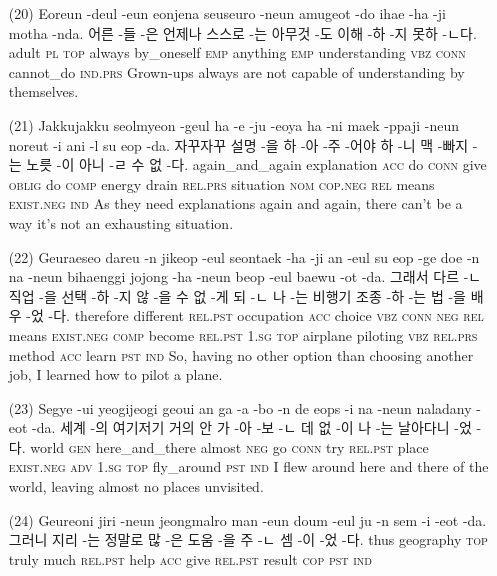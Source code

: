 \begin{itemize}
\item [(20)]
\tgl
		{Eoreun -deul -eun eonjena seuseuro -neun amugeot -do ihae -ha -ji motha -nda.}
		{어른 -들 -은 언제나 스스로 -는 아무것 -도 이해 -하 -지 못하 -ㄴ다.}
		{adult	\textsc{pl}	\textsc{top}	always	by\_oneself	\textsc{emp}	anything	\textsc{emp}	understanding	\textsc{vbz}	\textsc{conn}	cannot\_do	\textsc{ind.prs}}
		{Grown-ups always are not capable of understanding by themselves.}

\item [(21)]
\tgl
		{Jakkujakku seolmyeon -geul ha -e -ju -eoya ha -ni maek -ppaji -neun noreut -i ani -l su eop -da.}
		{자꾸자꾸 설명 -을 하 -아 -주 -어야 하 -니 맥 -빠지 -는 노릇 -이 아니 -ㄹ 수 없 -다.}
		{again\_and\_again	explanation	\textsc{acc}	do	\textsc{conn}	give	\textsc{oblig}	do	\textsc{comp}	energy	drain	\textsc{rel.prs}	situation	\textsc{nom}	\textsc{cop.neg}	\textsc{rel}	means	\textsc{exist.neg}	\textsc{ind}}
		{As they need explanations again and again, there can't be a way it's not an exhausting situation.}

\item [(22)]
\tgl
		{Geuraeseo dareu -n jikeop -eul seontaek -ha -ji an -eul su eop -ge doe -n na -neun bihaenggi jojong -ha -neun beop -eul baewu -ot -da.}
		{그래서 다르 -ㄴ 직업 -을 선택 -하 -지 않 -을 수 없 -게 되 -ㄴ 나 -는 비행기 조종 -하 -는 법 -을 배우 -었 -다.}
		{therefore	different	\textsc{rel.pst}	occupation	\textsc{acc}	choice	\textsc{vbz}	\textsc{conn}	\textsc{neg}	\textsc{rel}	means	\textsc{exist.neg}	\textsc{comp}	become	\textsc{rel.pst}	\textsc{1.sg}	\textsc{top}	airplane	piloting	\textsc{vbz}	\textsc{rel.prs}	method	\textsc{acc}	learn	\textsc{pst} \textsc{ind}}
		{So, having no other option than choosing another job, I learned how to pilot a plane.}

\item [(23)]
\tgl
		{Segye -ui yeogijeogi geoui an ga -a -bo -n de eops -i na -neun naladany -eot -da.}
		{세계 -의 여기저기 거의 안 가 -아 -보 -ㄴ 데 없 -이 나 -는 날아다니 -었 -다.}
		{world	\textsc{gen}	here\_and\_there	almost	\textsc{neg}	go	\textsc{conn}	try	\textsc{rel.pst}	place	\textsc{exist.neg}	\textsc{adv}	\textsc{1.sg}	\textsc{top}	fly\_around	\textsc{pst} \textsc{ind}}
		{I flew around here and there of the world, leaving almost no places unvisited.}

\item [(24)]
\tgl
		{Geureoni jiri -neun jeongmalro man -eun doum -eul ju -n sem -i -eot -da.}
		{그러니 지리 -는 정말로 많 -은 도움 -을 주 -ㄴ 셈 -이 -었 -다.}
		{thus	geography	\textsc{top}	truly	much	\textsc{rel.pst}	help	\textsc{acc}	give	\textsc{rel.pst}	result	\textsc{cop}	\textsc{pst}	\textsc{ind}}
		{}


\end{itemize}
